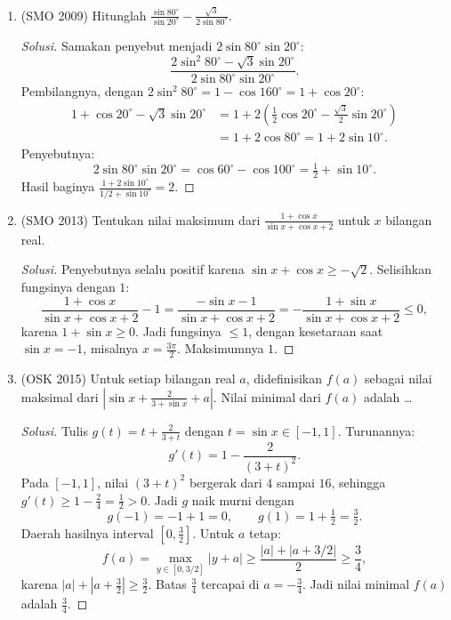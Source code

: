 \documentclass[12pt]{scrartcl}
\begin{document}
\begin{enumerate}
	\item (SMO 2009)
	Hitunglah $\frac{\sin 80^{\circ}}{\sin 20^{\circ}}
	- \frac{\sqrt{3}}{2\sin 80^{\circ}}$.
	\begin{proof}[Solusi]
	Samakan penyebut menjadi $2\sin 80^{\circ}\sin 20^{\circ}$:
	\[ \frac{2\sin^2 80^{\circ} - \sqrt{3}\sin 20^{\circ}}
	{2\sin 80^{\circ}\sin 20^{\circ}}. \]
	Pembilangnya, dengan $2\sin^2 80^{\circ} = 1 - \cos 160^{\circ} = 1 + \cos 20^{\circ}$:
	\begin{align*}
	1 + \cos 20^{\circ} - \sqrt{3}\sin 20^{\circ}
	&= 1 + 2\left(\tfrac12\cos 20^{\circ} - \tfrac{\sqrt{3}}{2}\sin 20^{\circ}\right) \\
	&= 1 + 2\cos 80^{\circ} = 1 + 2\sin 10^{\circ}.
	\end{align*}
	Penyebutnya:
	\[ 2\sin 80^{\circ}\sin 20^{\circ} = \cos 60^{\circ} - \cos 100^{\circ}
	= \tfrac12 + \sin 10^{\circ}. \]
	Hasil baginya $\frac{1+2\sin 10^{\circ}}{1/2+\sin 10^{\circ}} = 2$.
	\end{proof}

	\item (SMO 2013)
	Tentukan nilai maksimum dari $\frac{1+\cos x}{\sin x+\cos x+2}$
	untuk $x$ bilangan real.
	\begin{proof}[Solusi]
	Penyebutnya selalu positif karena $\sin x + \cos x \ge -\sqrt{2}$.
	Selisihkan fungsinya dengan $1$:
	\[ \frac{1+\cos x}{\sin x+\cos x+2} - 1
	= \frac{-\sin x - 1}{\sin x+\cos x+2}
	= -\frac{1+\sin x}{\sin x+\cos x+2} \le 0, \]
	karena $1 + \sin x \ge 0$. Jadi fungsinya $\le 1$,
	dengan kesetaraan saat $\sin x = -1$, misalnya $x = \frac{3\pi}{2}$.
	Maksimumnya $1$.
	\end{proof}

	\item (OSK 2015)
	Untuk setiap bilangan real $a$, didefinisikan $f(a)$ sebagai nilai maksimal
	dari $\left|\sin x+\frac{2}{3+\sin x}+a\right|$.
	Nilai minimal dari $f(a)$ adalah \dots
	\begin{proof}[Solusi]
	Tulis $g(t) = t + \frac{2}{3+t}$ dengan $t = \sin x \in [-1, 1]$.
	Turunannya:
	\[ g'(t) = 1 - \frac{2}{(3+t)^2}. \]
	Pada $[-1, 1]$, nilai $(3+t)^2$ bergerak dari $4$ sampai $16$, sehingga
	$g'(t) \ge 1 - \frac24 = \frac12 > 0$. Jadi $g$ naik murni dengan
	\[ g(-1) = -1 + 1 = 0, \qquad g(1) = 1 + \tfrac12 = \tfrac32. \]
	Daerah hasilnya interval $[0, \frac32]$. Untuk $a$ tetap:
	\[ f(a) = \max_{y \in [0,3/2]}|y+a| \ge \frac{|a| + |a+3/2|}{2} \ge \frac34, \]
	karena $|a| + |a+\frac32| \ge \frac32$. Batas $\frac34$ tercapai di
	$a = -\frac34$. Jadi nilai minimal $f(a)$ adalah $\frac34$.
	\end{proof}


\end{enumerate}
\end{document}
